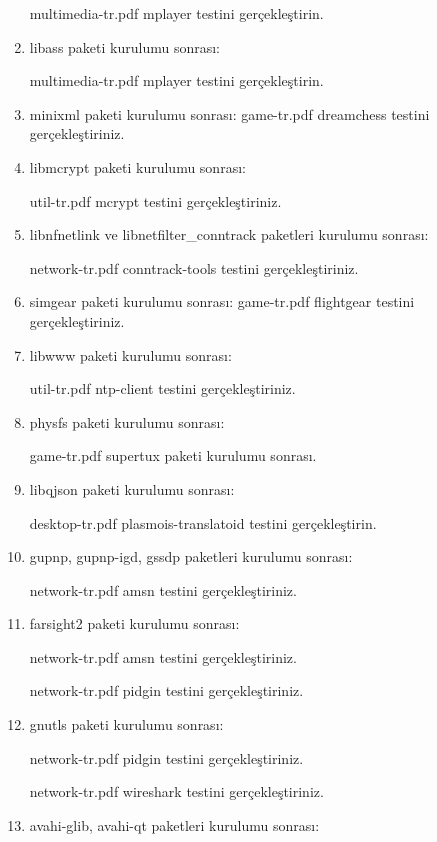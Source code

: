 \documentclass[a4paper,10pt]{article}
\begin{document}
\begin{enumerate}
multimedia-tr.pdf mplayer testini gerçekleştirin.

\item libass paketi kurulumu sonrası:

multimedia-tr.pdf mplayer testini gerçekleştirin.

\item minixml paketi kurulumu sonrası:
game-tr.pdf dreamchess testini gerçekleştiriniz.

\item libmcrypt paketi kurulumu sonrası:

util-tr.pdf mcrypt testini gerçekleştiriniz.

\item libnfnetlink ve libnetfilter\_conntrack paketleri kurulumu sonrası:

network-tr.pdf conntrack-tools testini gerçekleştiriniz.

\item simgear paketi kurulumu sonrası:
game-tr.pdf flightgear testini gerçekleştiriniz.

\item libwww paketi kurulumu sonrası:

util-tr.pdf ntp-client testini gerçekleştiriniz.

\item physfs paketi kurulumu sonrası:

game-tr.pdf supertux paketi kurulumu sonrası.

\item libqjson paketi kurulumu sonrası:

desktop-tr.pdf plasmois-translatoid testini gerçekleştirin.

\item gupnp, gupnp-igd, gssdp paketleri kurulumu sonrası:

network-tr.pdf amsn testini gerçekleştiriniz.

\item farsight2 paketi kurulumu sonrası:

network-tr.pdf amsn testini gerçekleştiriniz.

network-tr.pdf pidgin testini gerçekleştiriniz.

\item gnutls paketi kurulumu sonrası:

network-tr.pdf pidgin testini gerçekleştiriniz.

network-tr.pdf wireshark testini gerçekleştiriniz.

\item avahi-glib, avahi-qt paketleri kurulumu sonrası:


\end{enumerate}
\end{document}
